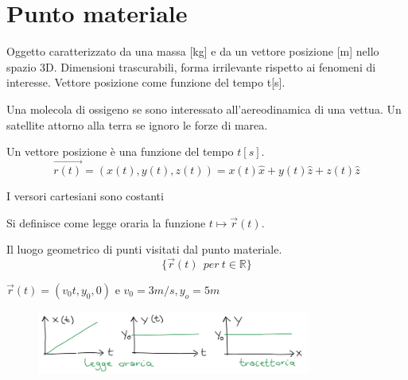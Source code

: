 \section{Punto materiale}
Oggetto caratterizzato da una massa [kg] e da un vettore posizione [m] nello spazio 3D.
Dimensioni trascurabili, forma irrilevante rispetto ai fenomeni di interesse.
Vettore posizione come funzione del tempo t[s].
\begin{example}
    Una molecola di ossigeno se sono interessato all'aereodinamica di una vettua. 
    Un satellite attorno alla terra se ignoro le forze di marea.
\end{example}
\hspace{-15pt}Un vettore posizione è una funzione del tempo $t[s]$.
$$\vec{r(t)} = (x(t), y(t), z(t)) = x(t)\hat{x} + y(t)\hat{z} + z(t)\hat{z}$$
\begin{observation}
    I versori cartesiani sono costanti
\end{observation}

\begin{definition}
    Si definisce come legge oraria la funzione $t \mapsto \vec{r}(t)$.
\end{definition}

\begin{definition}[Traiettoria]
    Il luogo geometrico di punti visitati dal punto materiale.
    $$\{\vec{r}(t)\:\: per \: t \in \mathbb{R}\}$$
\end{definition}

\begin{example}
    $\vec{r}(t) = (v_0t, y_0, 0)$ e $v_0 = 3m/s, y_o = 5m$ 
    \begin{figure}[h!]
        \centering
        \includegraphics[width=0.8\textwidth]{images/ess-traiettoria.png}
    \end{figure}
\end{example}


